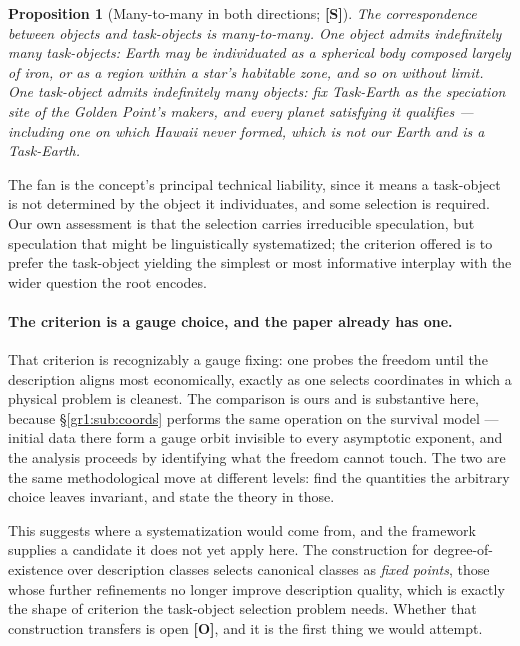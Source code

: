 \documentclass[11pt]{article}
\numberwithin{equation}{section}
\theoremstyle{plain}
\newtheorem{proposition}[theorem]{Proposition}
\theoremstyle{definition}
\theoremstyle{remark}
\begin{document}
\begin{proposition}[Many-to-many in both directions; \textbf{[S]}]
\label{to:prop:fan}
The correspondence between objects and task-objects is many-to-many.
One object admits indefinitely many task-objects: Earth may be
individuated as a spherical body composed largely of iron, or as a
region within a star's habitable zone, and so on without limit. One
task-object admits indefinitely many objects: fix Task-Earth as the
speciation site of the Golden Point's makers, and every planet
satisfying it qualifies --- including one on which Hawaii never formed,
which is not our Earth and is a Task-Earth.
\end{proposition}

The fan is the concept's principal technical liability, since it means a
task-object is not determined by the object it individuates, and some
selection is required. Our own assessment is that the
selection carries irreducible speculation, but speculation that might be
linguistically systematized; the criterion offered is to prefer the
task-object yielding the simplest or most informative interplay with the
wider question the root encodes.

\paragraph{The criterion is a gauge choice, and the paper already
has one.}\label{to:rem:gauge}
That criterion is recognizably a gauge fixing: one probes the freedom
until the description aligns most economically, exactly as one selects
coordinates in which a physical problem is cleanest. The comparison is
ours and is substantive here, because
\S\ref{gr1:sub:coords} performs the same operation on the survival
model --- initial data there form a gauge orbit invisible to every
asymptotic exponent, and the analysis proceeds by identifying what the
freedom cannot touch. The two are the same methodological move at
different levels: find the quantities the arbitrary choice leaves
invariant, and state the theory in those.

This suggests where a systematization would come from, and the framework
supplies a candidate it does not yet apply here. The construction for
degree-of-existence over description classes \cite{Aethus} selects
canonical classes as \emph{fixed points}, those whose further
refinements no longer improve description quality, which is exactly
the shape of criterion the task-object selection problem needs. Whether
that construction transfers is open \textbf{[O]}, and it is the first
thing we would attempt.
\end{document}

